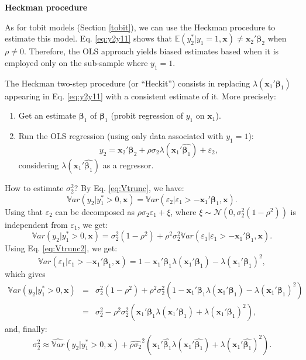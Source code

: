 \documentclass[
  12pt,
]{book}
\providecommand{\tightlist}{%
  \setlength{\itemsep}{0pt}\setlength{\parskip}{0pt}}
\theoremstyle{definition}
\theoremstyle{definition}
\theoremstyle{definition}
\theoremstyle{definition}
\theoremstyle{remark}
\begin{document}
\textbf{Heckman procedure}

As for tobit models (Section \ref{tobit}), we can use the Heckman procedure to estimate this model. Eq. \eqref{eq:y2y11} shows that \(\mathbb{E}(y_2^*|y_1=1,\mathbf{x}) \ne \mathbf{x}_2'\boldsymbol\beta_2\) when \(\rho \ne 0\). Therefore, the OLS approach yields biased estimates based when it is employed only on the sub-sample where \(y_1=1\).

The Heckman two-step procedure (or ``Heckit'') consists in replacing \(\lambda(\mathbf{x}_1'\boldsymbol\beta_1)\) appearing in Eq. \eqref{eq:y2y11} with a consistent estimate of it. More precisely:

\begin{enumerate}
\def\labelenumi{\arabic{enumi}.}
\tightlist
\item
  Get an estimate \(\widehat{\boldsymbol\beta_1}\) of \(\boldsymbol\beta_1\) (probit regression of \(y_1\) on \(\mathbf{x}_1\)).
\item
  Run the OLS regression (using only data associated with \(y_1=1\)):
  \begin{equation}\label{eq:OLSregHeckit}
  y_2  = \mathbf{x}_2'\boldsymbol\beta_2 + \rho \sigma_2 \lambda(\mathbf{x}_1'\widehat{\boldsymbol\beta_1}) + \varepsilon_2,
  \end{equation}
  considering \(\lambda(\mathbf{x}_1'\widehat{\boldsymbol\beta_1})\) as a regressor.
\end{enumerate}

How to estimate \(\sigma_2^2\)? By Eq. \eqref{eq:Vtrunc}, we have:
\[
\mathbb{V}ar(y_2|y_1^*>0,\mathbf{x}) = \mathbb{V}ar(\varepsilon_2|\varepsilon_1>-\mathbf{x}_1'\boldsymbol\beta_1,\mathbf{x}).
\]
Using that \(\varepsilon_2\) can be decomposed as \(\rho\sigma_2\varepsilon_1 + \xi\), where \(\xi \sim \mathcal{N}(0,\sigma_2^2(1-\rho^2))\) is independent from \(\varepsilon_1\), we get:
\[
\mathbb{V}ar(y_2|y_1^*>0,\mathbf{x}) = \sigma_2^2(1-\rho^2) + \rho^2\sigma_2^2 \mathbb{V}ar(\varepsilon_1|\varepsilon_1>-\mathbf{x}_1'\boldsymbol\beta_1,\mathbf{x}).
\]
Using Eq. \eqref{eq:Vtrunc2}, we get:
\[
\mathbb{V}ar(\varepsilon_1|\varepsilon_1>-\mathbf{x}_1'\boldsymbol\beta_1,\mathbf{x}) = 1 - \mathbf{x}_1'\boldsymbol\beta_1 \lambda(\mathbf{x}_1'\boldsymbol\beta_1) - \lambda(\mathbf{x}_1'\boldsymbol\beta_1)^2,
\]
which gives
\begin{eqnarray*}
\mathbb{V}ar(y_2|y_1^*>0,\mathbf{x}) &=& \sigma_2^2(1-\rho^2) + \rho^2\sigma_2^2 (1 - \mathbf{x}_1'\boldsymbol\beta_1 \lambda(\mathbf{x}_1'\boldsymbol\beta_1) - \lambda(\mathbf{x}_1'\boldsymbol\beta_1)^2)\\
&=& \sigma_2^2 - \rho^2\sigma_2^2 \left(\mathbf{x}_1'\boldsymbol\beta_1 \lambda(\mathbf{x}_1'\boldsymbol\beta_1) + \lambda(\mathbf{x}_1'\boldsymbol\beta_1)^2\right),
\end{eqnarray*}
and, finally:
\[
\sigma_2^2 \approx \widehat{\mathbb{V}ar}(y_2|y_1^*>0,\mathbf{x}) + \widehat{\rho \sigma_2}^2 \left(\mathbf{x}_1'\widehat{\boldsymbol\beta_1} \lambda(\mathbf{x}_1'\widehat{\boldsymbol\beta_1}) + \lambda(\mathbf{x}_1'\widehat{\boldsymbol\beta_1})^2\right).
\]
\end{document}
